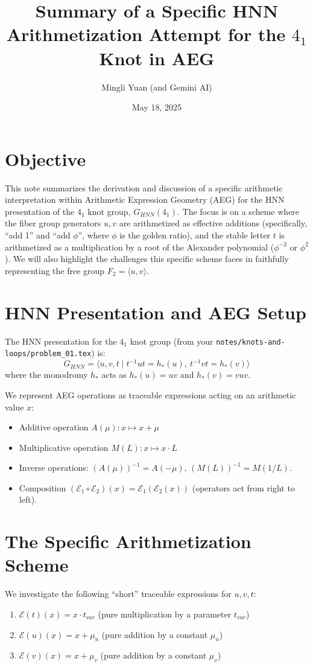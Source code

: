\documentclass[12pt, a4paper]{article}
\title{Summary of a Specific HNN Arithmetization Attempt for the $4_1$ Knot in AEG}
\author{Mingli Yuan (and Gemini AI)}
\date{May 18, 2025}
\begin{document}
\maketitle

\section{Objective}
This note summarizes the derivation and discussion of a specific arithmetic interpretation within Arithmetic Expression Geometry (AEG) for the HNN presentation of the $4_1$ knot group, $G_{HNN}(4_1)$. The focus is on a scheme where the fiber group generators $u,v$ are arithmetized as effective additions (specifically, ``add 1'' and ``add $\phi$'', where $\phi$ is the golden ratio), and the stable letter $t$ is arithmetized as a multiplication by a root of the Alexander polynomial ($\phi^{-2}$ or $\phi^2$). We will also highlight the challenges this specific scheme faces in faithfully representing the free group $F_2 = \langle u,v \rangle$.

\section{HNN Presentation and AEG Setup}
The HNN presentation for the $4_1$ knot group (from your \texttt{notes/knots-and-loops/problem\_01.tex}) is:
$$ G_{HNN} = \langle u, v, t \mid t^{-1}ut = h_*(u), \ t^{-1}vt = h_*(v) \rangle $$
where the monodromy $h_*$ acts as $h_*(u) = uv$ and $h_*(v) = vuv$.

We represent AEG operations as traceable expressions acting on an arithmetic value $x$:
\begin{itemize}
    \item Additive operation $A(\mu): x \mapsto x + \mu$
    \item Multiplicative operation $M(L): x \mapsto x \cdot L$
    \item Inverse operations: $(A(\mu))^{-1} = A(-\mu)$, $(M(L))^{-1} = M(1/L)$.
    \item Composition $(\mathcal{E}_1 \circ \mathcal{E}_2)(x) = \mathcal{E}_1(\mathcal{E}_2(x))$ (operators act from right to left).
\end{itemize}

\section{The Specific Arithmetization Scheme}
We investigate the following ``short'' traceable expressions for $u, v, t$:
\begin{enumerate}
    \item $\mathcal{E}(t)(x) = x \cdot t_{var}$ (pure multiplication by a parameter $t_{var}$)
    \item $\mathcal{E}(u)(x) = x + \mu_u$ (pure addition by a constant $\mu_u$)
    \item $\mathcal{E}(v)(x) = x + \mu_v$ (pure addition by a constant $\mu_v$)
\end{enumerate}
\end{document}
